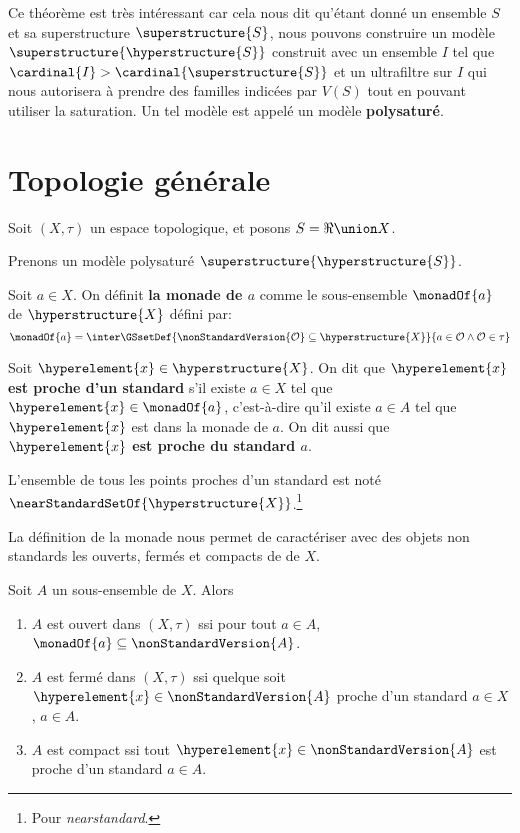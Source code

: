 Ce théorème est très intéressant car cela nous dit qu'étant donné un ensemble
$S$ et sa superstructure $\superstructure{S}$, nous pouvons construire un modèle
$\superstructure{\hyperstructure{S}}$ construit avec un ensemble $I$ tel que
$\cardinal{I} > \cardinal{\superstructure{S}}$ et un ultrafiltre sur $I$ qui
nous autorisera à prendre des familles indicées par $V(S)$ tout en pouvant
utiliser la saturation. Un tel modèle est appelé un modèle \textbf{polysaturé}.

\section{Topologie générale}

\label{general_topology}

Soit $(X, \tau)$ un espace topologique, et posons $S = \real \union X$.

Prenons un modèle polysaturé $\superstructure{\hyperstructure{S}}$.

\begin{definition} [Monade]
	Soit $a \in X$. On définit \textbf{la monade de $a$} comme le sous-ensemble
	$\monadOf{a}$ de $\hyperstructure{X}$ défini par:
	\begin{equation}
		\monadOf{a} = \inter \GSsetDef{\nonStandardVersion{\mathcal{O}} \subseteq
		\hyperstructure{X}}{a \in \mathcal{O} \wedge \mathcal{O} \in \tau}
	\end{equation}
\end{definition}

\begin{definition} 
	Soit $\hyperelement{x} \in \hyperstructure{X}$. On dit que
	\textbf{$\hyperelement{x}$ est proche d'un
	standard} s'il existe $a \in X$ tel que $\hyperelement{x} \in \monadOf{a}$,
	c'est-à-dire qu'il existe $a \in A$ tel que $\hyperelement{x}$ est dans la
	monade de $a$. On dit aussi que \textbf{$\hyperelement{x}$ est proche du
	standard $a$}.

	L'ensemble de tous les points proches d'un standard est noté
	$\nearStandardSetOf{\hyperstructure{X}}$.\footnote{Pour
		\textit{nearstandard}.}
\end{definition}

La définition de la monade nous permet de caractériser avec des objets non
standards les ouverts, fermés et compacts de
de $X$.

\begin{proposition}
	Soit $A$ un sous-ensemble de $X$. Alors
	\begin{enumerate}
		\item $A$ est ouvert dans $(X, \tau)$ ssi pour tout $a \in A$,
			$\monadOf{a} \subseteq \nonStandardVersion{A}$.
		\item $A$ est fermé dans $(X, \tau)$ ssi quelque soit $\hyperelement{x}
			\in \nonStandardVersion{A}$ proche d'un standard $a \in X$, $a \in
			A$.
		\item $A$ est compact ssi tout $\hyperelement{x} \in
			\nonStandardVersion{A}$ est proche d'un standard $a \in A$.
	\end{enumerate}
\end{proposition}

